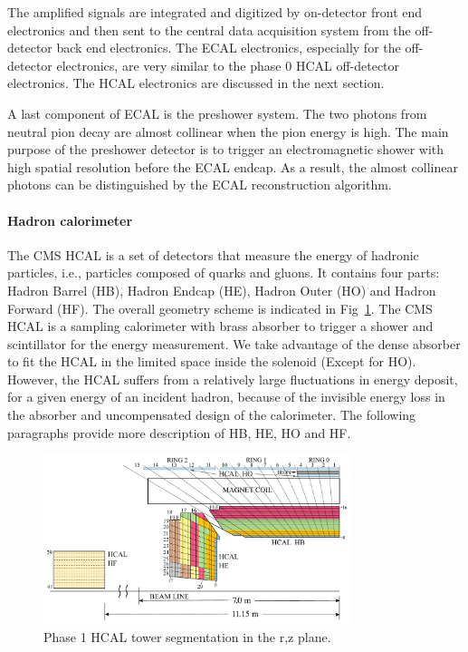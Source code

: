 The amplified signals are integrated and digitized by on-detector front end electronics and then sent to the central data acquisition system from the off-detector back end electronics. The ECAL electronics, especially for the off-detector electronics, are very similar to the phase 0 HCAL off-detector electronics. The HCAL electronics are discussed in the next section.

A last component of ECAL is the preshower system. The two photons from neutral pion decay are almost collinear when the pion energy is high. The main purpose of the preshower detector is to trigger an electromagnetic shower with high spatial resolution before the ECAL endcap. As a result, the almost collinear photons can be distinguished by the ECAL reconstruction algorithm. 

\paragraph{Hadron calorimeter}

The CMS HCAL is a set of detectors that measure the energy of hadronic particles, i.e., particles composed of quarks and gluons. It contains four parts: Hadron Barrel (HB), Hadron Endcap (HE), Hadron Outer (HO) and Hadron Forward (HF). The overall geometry scheme is indicated in Fig~\ref{fig:c3cms2dhcal}. The CMS HCAL is a sampling calorimeter with brass absorber to trigger a shower and scintillator for the energy measurement. We take advantage of the dense absorber to fit the HCAL in the limited space inside the solenoid (Except for HO). However, the HCAL suffers from a relatively large fluctuations in energy deposit, for a given energy of an incident hadron, because of the invisible energy loss in the absorber and uncompensated design of the calorimeter. The following paragraphs provide more description of HB, HE, HO and HF.

\begin{figure}[htbp]
 \begin{center}
  \includegraphics[width=0.8\textwidth]{figures/c3/c3_cms_2dhcal.pdf}
 \end{center}
 \caption{Phase 1 HCAL tower segmentation in the r,z plane.}
 \label{fig:c3cms2dhcal}
\end{figure}

